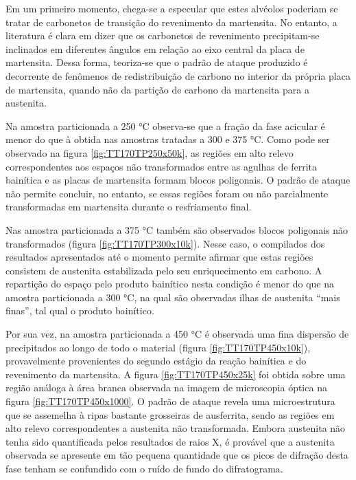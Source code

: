 Em um primeiro momento, chega-se a especular que estes alvéolos poderiam se tratar de carbonetos de transição do revenimento da martensita. No entanto, a literatura é clara em dizer que os carbonetos de revenimento precipitam-se inclinados em diferentes ângulos em relação ao eixo central da placa de martensita. %
Dessa forma, teoriza-se que o padrão de ataque produzido é decorrente de fenômenos de redistribuição de carbono no interior da própria placa de martensita, quando não da partição de carbono da martensita para a austenita.

Na amostra particionada a 250 °C observa-se que a fração da fase acicular é menor do que à obtida nas amostras tratadas a 300 e 375 °C. Como pode ser observado na figura \ref{fig:TT170TP250x50k}, as regiões em alto relevo correspondentes aos espaços não transformados entre as agulhas de ferrita bainítica e as placas de martensita formam blocos poligonais. O padrão de ataque não permite concluir, no entanto, se essas regiões foram ou não parcialmente transformadas em martensita durante o resfriamento final.

Nas amostra particionada a 375 °C também são observados blocos poligonais não transformados (figura \ref{fig:TT170TP300x10k}). Nesse caso, o compilados dos resultados apresentados até o momento permite afirmar que estas regiões consistem de austenita estabilizada pelo seu enriquecimento em carbono. A repartição do espaço pelo produto bainítico nesta condição é menor do que na amostra particionada a 300 °C, na qual são observadas ilhas de austenita ``mais finas'', tal qual o produto bainítico.

Por sua vez, na amostra particionada a 450 °C é observada uma fina dispersão de precipitados ao longo de todo o material (figura \ref{fig:TT170TP450x10k}), provavelmente provenientes do segundo estágio da reação bainítica e do revenimento da martensita. A figura \ref{fig:TT170TP450x25k} foi obtida sobre uma região análoga à área branca observada na imagem de microscopia óptica na figura \ref{fig:TT170TP450x1000}. O padrão de ataque revela uma microestrutura que se assemelha à ripas bastante grosseiras de ausferrita, sendo as regiões em alto relevo correspondentes a austenita não transformada. Embora austenita não tenha sido quantificada pelos resultados de raios X, é provável que a austenita observada se apresente em tão pequena quantidade que os picos de difração desta fase tenham se confundido com o ruído de fundo do difratograma.